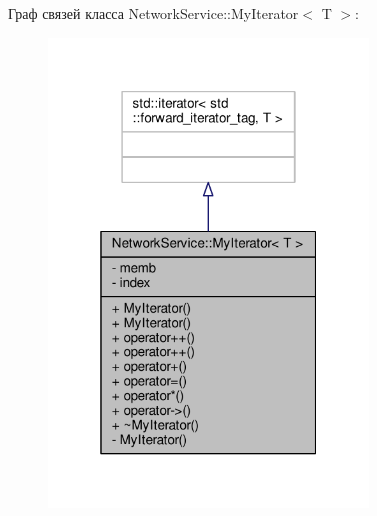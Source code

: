 Граф связей класса Network\+Service\+:\+:My\+Iterator$<$ T $>$\+:\nopagebreak
\begin{figure}[H]
\begin{center}
\leavevmode
\includegraphics[width=241pt]{class_network_service_1_1_my_iterator__coll__graph}
\end{center}
\end{figure}
